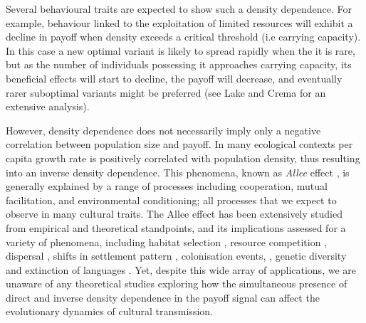 \documentclass[review,authoryear]{elsarticle}
\begin{document}
Several behavioural traits are expected to show such a density dependence. For example, behaviour linked to the exploitation of limited resources will exhibit a decline in payoff when density exceeds a critical threshold (i.e carrying capacity). In this case a new optimal variant is likely to spread rapidly when the it is rare, but as the number of individuals possessing it approaches carrying capacity, its beneficial effects will start to decline, the payoff will decrease, and eventually rarer suboptimal variants might be preferred (see Lake and Crema \citeyear{lake_and_crema_2012} for an extensive analysis). 

However, density dependence does not necessarily imply only a negative correlation between population size and payoff. In many ecological contexts per capita growth rate is positively correlated with population density, thus resulting into an inverse density dependence. This phenomena, known as \emph{Allee} effect \citep{allee1958,courchamp_etal_1999}, is generally explained by a range of processes including cooperation, mutual facilitation, and environmental conditioning; all processes that we expect to observe  in many cultural traits. The Allee effect has been extensively studied  from  empirical and theoretical standpoints, and its implications assessed for a variety of phenomena, including habitat selection \citep{greene_and_stamps_2001}, resource competition \citep{jang2013},  dispersal \citep{steele_2009}, shifts in settlement pattern \citep{crema_2014}, colonisation events,  \citep{kennet_etal_2006}, genetic diversity \citep{roques_etal_2012} and extinction of languages \citep{sutherland_2003} . Yet, despite this wide array of applications, we are unaware of any theoretical studies exploring how the simultaneous presence of direct and inverse density dependence in the payoff signal can affect the evolutionary dynamics of cultural transmission.   
\end{document}
